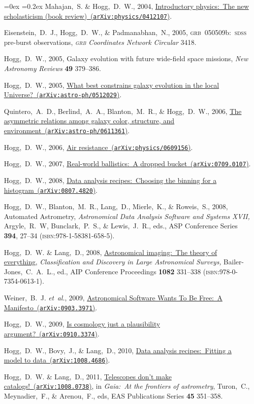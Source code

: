 \documentclass[12pt,letterpaper]{article}
\newcommand{\latin}[1]{\textsl{#1}}
\newcommand{\etal}{\latin{et~al.}}
\newcommand{\doi}[2]{\href{http://dx.doi.org/#1}{{#2}}}
\newcommand{\isbn}[1]{{\footnotesize(\textsc{isbn:}{#1})}}
\newcommand{\arxiv}[2]{\href{http://arxiv.org/abs/#1}{{#2}\ (\texttt{arXiv:#1})}}
\newcounter{refpubnum}
\newcommand{\hogglist}{%
    \rightmargin=0in
    \leftmargin=0.18in
    \topsep=0ex
    \partopsep=0pt
    \itemsep=0.2ex
    \parsep=0pt
    \itemindent=-1.0\leftmargin
    \listparindent=0.0\leftmargin
    \settowidth{\labelsep}{~}
    \usecounter{refpubnum}
  }
\begin{document}
\begin{list}{}{\hogglist}
Mahajan,~S. \& Hogg,~D.~W., 2004,
\arxiv{physics/0412107}{Introductory physics:\ The new scholasticism (book review)}.
\item
Eisenstein,~D.~J., Hogg,~D.~W., \& Padmanabhan,~N., 2005,
{\textsc{grb}~050509b:\ \textsc{sdss} pre-burst observations},
\textit{\textsc{grb} Coordinates Network Circular} 3418.
\item
Hogg,~D.~W., 2005,
{Galaxy evolution with future wide-field space missions},
\textit{New Astronomy Reviews} \textbf{49} 379--386.
\item
Hogg,~D.~W., 2005,
\arxiv{astro-ph/0512029}{What best constrains galaxy evolution in the local Universe?}.
\item
Quintero,~A.~D., Berlind,~A.~A., Blanton,~M.~R., \& Hogg,~D.~W., 2006,
\arxiv{astro-ph/0611361}{The asymmetric relations among galaxy color, structure, and environment}.
\item
Hogg,~D.~W., 2006,
\arxiv{physics/0609156}{Air resistance}.
\item
Hogg,~D.~W., 2007,
\arxiv{0709.0107}{Real-world ballistics:\ A dropped bucket}.
\item
Hogg,~D.~W., 2008,
\arxiv{0807.4820}{Data analysis recipes:\ Choosing the binning for a histogram}.
\item
Hogg,~D.~W., Blanton,~M.~R., Lang,~D., Mierle,~K., \& Roweis,~S., 2008,
{Automated Astrometry},
\textit{Astronomical Data Analysis
Software and Systems XVII,} Argyle,~R.~W, Bunclark,~P.~S., \&
Lewis,~J.~R., eds., ASP Conference Series \textbf{394}, 27--34
\isbn{978-1-58381-658-5}.
\item
Hogg,~D.~W. \& Lang,~D., 2008,
\doi{10.1063/1.3059072}{Astronomical imaging:\ The theory of everything},
\textit{Classification and Discovery in Large Astronomical
Surveys,} Bailer-Jones,~C.~A.~L., ed., AIP Conference Proceedings
\textbf{1082} 331--338 \isbn{978-0-7354-0613-1}.
\item
Weiner,~B.~J. \etal, 2009,
\arxiv{0903.3971}{Astronomical Software Wants To Be Free:\ A Manifesto}.
\item
Hogg,~D.~W., 2009,
\arxiv{0910.3374}{Is cosmology just a plausibility argument?}.
\item
Hogg,~D.~W., Bovy,~J., \& Lang,~D., 2010,
\arxiv{1008.4686}{Data analysis recipes:\ Fitting a model to data}.
\item
Hogg,~D.~W. \& Lang,~D., 2011,
\arxiv{1008.0738}{Telescopes don't make catalogs!},
in \textit{Gaia:\ At the frontiers of astrometry}, Turon,~C., Meynadier,~F., \& Arenou,~F., eds,
EAS Publications Series \textbf{45} 351--358.

\end{list}
\end{document}
